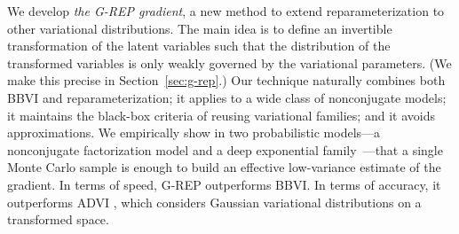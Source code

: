 
We develop \textit{the \gls{G-REP}
gradient}, a new method to extend reparameterization to other
variational distributions. The main idea is to define an invertible
transformation of the latent variables such that the distribution of the
transformed variables is only weakly governed by the variational parameters. (We make this precise in Section~\ref{sec:g-rep}.) Our technique naturally combines both
\gls{BBVI} and reparameterization; it applies to a wide class of
nonconjugate models; it maintains the black-box criteria of reusing
variational families; and it avoids approximations. We empirically
show in two probabilistic models---a nonconjugate factorization
model and a deep exponential family~\citep{Ranganath2015}---that a
single Monte Carlo sample is enough to build an effective low-variance
estimate of the gradient. In terms of speed, \gls{G-REP}
outperforms \gls{BBVI}. In terms of accuracy, it outperforms
\gls{ADVI} \citep{Kucukelbir2016}, which considers Gaussian variational
distributions on a transformed space.


